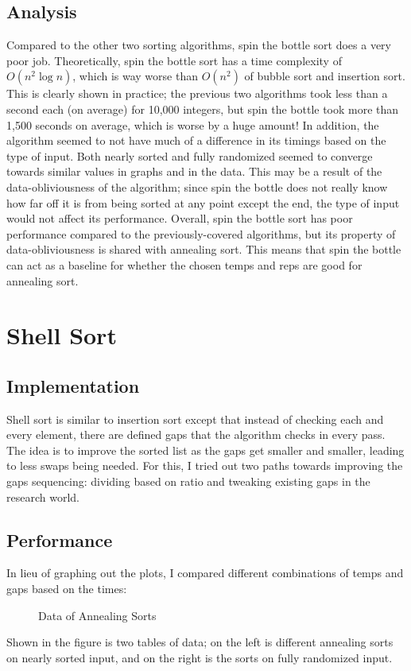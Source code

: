 \documentclass{article}
\begin{document}
\subsection{Analysis}
    Compared to the other two sorting algorithms, spin the bottle sort does a
    very poor job. Theoretically, spin the bottle sort has a time complexity of
    $O(n^{2}\log{n})$, which is way worse than $O(n^2)$ of bubble sort and
    insertion sort. This is clearly shown in practice; the previous two
    algorithms took less than a second each (on average) for 10,000 integers,
    but spin the bottle took more than 1,500 seconds on average, which is 
    worse by a huge amount!
    \nextblurb
    In addition, the algorithm seemed to not have much of a difference in its 
    timings based on the type of input. Both nearly sorted and fully randomized
    seemed to converge towards similar values in graphs and in the data. This
    may be a result of the data-obliviousness of the algorithm; since spin the
    bottle does not really know how far off it is from being sorted at any point
    except the end, the type of input would not affect its performance. 
    \nextblurb
    Overall, spin the bottle sort has poor performance compared to the
    previously-covered algorithms, but its property of data-obliviousness is
    shared with annealing sort. This means that spin the bottle can act as a
    baseline for whether the chosen temps and reps are good for annealing sort.

\section{Shell Sort}
\subsection{Implementation}
    Shell sort is similar to insertion sort except that instead of checking each
    and every element, there are defined gaps that the algorithm checks in every
    pass. The idea is to improve the sorted list as the gaps get smaller and
    smaller, leading to less swaps being needed.
    \nextblurb
    For this, I tried out two paths towards improving the gaps sequencing: 
    dividing based on ratio and tweaking existing gaps in the research world.
\subsection{Performance}
    In lieu of graphing out the plots, I compared different combinations of
    temps and gaps based on the times:
    \begin{figure}[H]
        \centering
        \caption{Data of Annealing Sorts}
    \end{figure}
    \noindent Shown in the figure is two tables of data; on the left is 
    different annealing sorts on nearly sorted input, and on the right is the 
    sorts on fully randomized input. 
\end{document}

